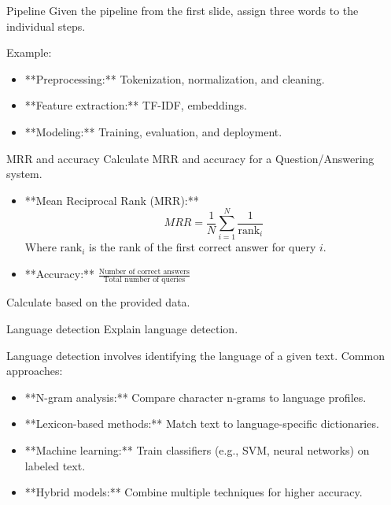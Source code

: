 \documentclass{article}
\begin{document}
\begin{exercise}{Pipeline}
  Given the pipeline from the first slide, assign three words to the individual steps.

  \begin{solution}
    Example:
    \begin{itemize}
        \item **Preprocessing:** Tokenization, normalization, and cleaning.
        \item **Feature extraction:** TF-IDF, embeddings.
        \item **Modeling:** Training, evaluation, and deployment.
    \end{itemize}
  \end{solution}
\end{exercise}

\begin{exercise}{MRR and accuracy}
  Calculate MRR and accuracy for a Question/Answering system.

  \begin{solution}
    \begin{itemize}
        \item **Mean Reciprocal Rank (MRR):**
        \[
        MRR = \frac{1}{N} \sum_{i=1}^{N} \frac{1}{\text{rank}_i}
        \]
        Where \(\text{rank}_i\) is the rank of the first correct answer for query \(i\).
        \item **Accuracy:** \(\frac{\text{Number of correct answers}}{\text{Total number of queries}}\)
    \end{itemize}
    Calculate based on the provided data.
  \end{solution}
\end{exercise}

\begin{exercise}{Language detection}
  Explain language detection.

  \begin{solution}
    Language detection involves identifying the language of a given text. Common approaches:
    \begin{itemize}
        \item **N-gram analysis:** Compare character n-grams to language profiles.
        \item **Lexicon-based methods:** Match text to language-specific dictionaries.
        \item **Machine learning:** Train classifiers (e.g., SVM, neural networks) on labeled text.
        \item **Hybrid models:** Combine multiple techniques for higher accuracy.
    \end{itemize}
  \end{solution}
\end{exercise}
\end{document}

